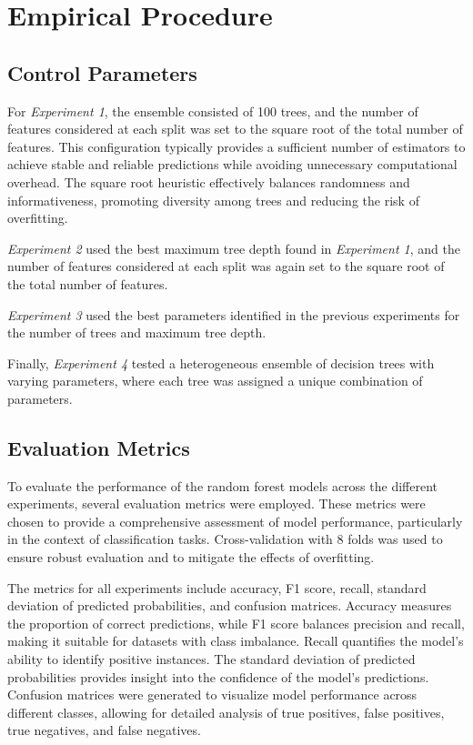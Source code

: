 \documentclass[conference]{IEEEtran}
\begin{document}
\section{Empirical Procedure}

\subsection{Control Parameters}

For \textit{Experiment 1}, the ensemble consisted of 100 trees, and the number of features considered at each split was set to the square root of the total number of features. This configuration typically provides a sufficient number of estimators to achieve stable and reliable predictions while avoiding unnecessary computational overhead. The square root heuristic effectively balances randomness and informativeness, promoting diversity among trees and reducing the risk of overfitting.

\textit{Experiment 2} used the best maximum tree depth found in \textit{Experiment 1}, and the number of features considered at each split was again set to the square root of the total number of features.

\textit{Experiment 3} used the best parameters identified in the previous experiments for the number of trees and maximum tree depth.

Finally, \textit{Experiment 4} tested a heterogeneous ensemble of decision trees with varying parameters, where each tree was assigned a unique combination of parameters.

\subsection{Evaluation Metrics}

To evaluate the performance of the random forest models across the different experiments, several evaluation metrics were employed. These metrics were chosen to provide a comprehensive assessment of model performance, particularly in the context of classification tasks. Cross-validation with 8 folds was used to ensure robust evaluation and to mitigate the effects of overfitting.

The metrics for all experiments include accuracy, F1 score, recall, standard deviation of predicted probabilities, and confusion matrices. Accuracy measures the proportion of correct predictions, while F1 score balances precision and recall, making it suitable for datasets with class imbalance. Recall quantifies the model's ability to identify positive instances. The standard deviation of predicted probabilities provides insight into the confidence of the model's predictions. Confusion matrices were generated to visualize model performance across different classes, allowing for detailed analysis of true positives, false positives, true negatives, and false negatives.
\end{document}
